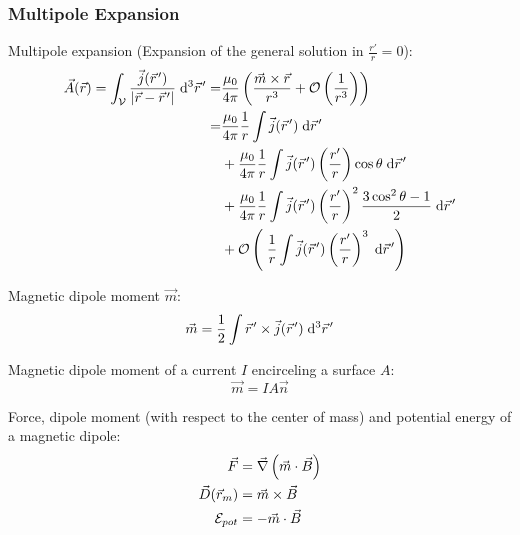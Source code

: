 		\subsubsection{Multipole Expansion}
			\noindent
			Multipole expansion (Expansion of the general solution in $\frac{r'}{r}=0$):
			\begin{equation}
				\begin{aligned}
					\vec{A}(\vec{r}) = \int_{\mathcal{V}} \frac{\vec{j}(\pvec{r}')}{\left|\vec{r}-\pvec{r}'\right|} \;\diff^3\pvec{r}'
					=& \frac{\mu_0}{4\pi} \left(\frac{\vec{m}\times\vec{r}}{r^3} + \mathcal{O}\left(\frac{1}{r^3}\right)\right) \\
					=& \frac{\mu_0}{4\pi}\frac{1}{r}\int\vec{j}(\pvec{r}')\;\diff \pvec{r}' \\
					&+ \frac{\mu_0}{4\pi}\frac{1}{r}\int\vec{j}(\pvec{r}')\left(\frac{r'}{r}\right)\cos\theta\;\diff \pvec{r}' \\
					&+ \frac{\mu_0}{4\pi}\frac{1}{r}\int\vec{j}(\pvec{r}')\left(\frac{r'}{r}\right)^2\frac{3\cos^2\theta-1}{2}\;\diff \pvec{r}' \\
					&+ \mathcal{O}\left(\;\frac{1}{r}\int\vec{j}(\pvec{r}')\left(\frac{r'}{r}\right)^3 \;\diff \pvec{r}'\right) \\
				\end{aligned}
			\end{equation}

			\noindent
			Magnetic dipole moment $\vec{m}$:
			\begin{equation}
				\begin{aligned}
					\vec{m} = \frac{1}{2}\int \pvec{r}'\times\vec{j}(\pvec{r}')\;\diff^3\pvec{r}'
				\end{aligned}
			\end{equation}

			\noindent
			Magnetic dipole moment of a current $I$ encirceling a surface $A$:
			\begin{equation}
				\vec{m} = IA\vec{n}
			\end{equation}

			\noindent
			Force, dipole moment (with respect to the center of mass) and potential energy of a magnetic dipole:
			\begin{equation}
				\begin{aligned}
					\vec{F} &= \vec{\nabla}\left(\vec{m}\cdot\vec{B}\right) \\
					\vec{D}(\vec{r}_m) &= \vec{m}\times\vec{B} \\
					\mathcal{E}_{pot} &= -\vec{m}\cdot\vec{B} \\
				\end{aligned}
			\end{equation}

